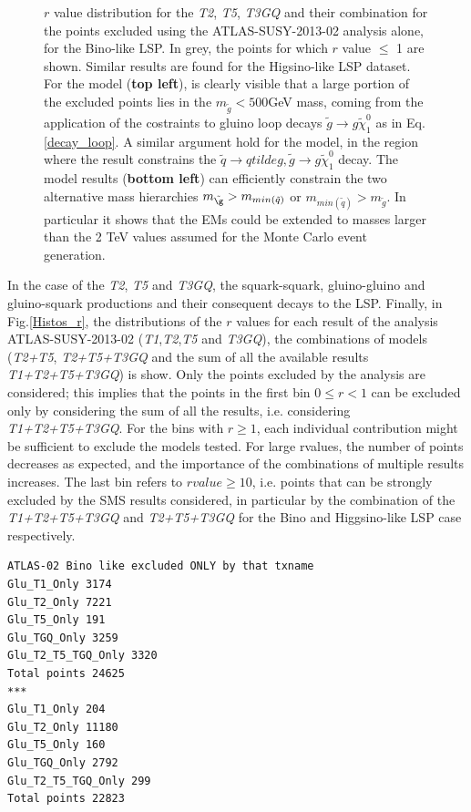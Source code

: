 \documentclass[epj,nopacs,fleqn]{svjour}
\begin{document}
\begin{figure}[!]
	\caption{$r$ value distribution for the \textit{T2}, \textit{T5}, \textit{T3GQ} and their combination for the points excluded using the ATLAS-SUSY-2013-02 analysis alone, for the Bino-like LSP. In grey, the points for which $r$ value $\leq$ 1 are shown. Similar results are found for the Higsino-like LSP dataset. For the \Ttwo model (\textbf{top left}), is clearly visible that a large portion of the excluded points lies in the $m_{\tilde g}<500 $GeV mass, coming from the application of the costraints to gluino loop decays $\tilde g \rightarrow g \tilde \chi _1 ^0$ as in Eq. \ref{decay_loop}. A similar argument hold for the \Tfive model, in the region where the result constrains the $\tilde q \rightarrow q tilde g , \tilde g \rightarrow  g \tilde \chi _1 ^0$ decay. The \TGQ model results (\textbf{bottom left}) can efficiently constrain the two alternative mass hierarchies $m_{\tilde \g}>m_{min(\tilde q)}$ or $m_{min(\tilde q)}>m_{\tilde g }$. In particular it shows that the EMs could be extended to \MGLU masses larger than the 2 TeV values assumed for the Monte Carlo event generation.}
	\label{rvalues-bino}
\end{figure}
In the case of the \textit{T2}, \textit{T5} and \textit{T3GQ}, the squark-squark, gluino-gluino and gluino-squark productions and their consequent decays to the LSP. Finally, in Fig.\ref{Histos_r}, the distributions of the $r$ values for each result of the analysis ATLAS-SUSY-2013-02 (\textit{T1},\textit{T2},\textit{T5} and \textit{T3GQ}), the combinations of models (\textit{T2+T5}, \textit{T2+T5+T3GQ} and the sum of all the available results \textit{T1+T2+T5+T3GQ}) is show. Only the points excluded by the analysis are considered; this implies that the points in the first bin $0\leq r < 1$ can be excluded only by considering the sum of all the results, i.e. considering \textit{T1+T2+T5+T3GQ}. For the bins with $r \geq 1$, each individual contribution might be sufficient to exclude the models tested. For large rvalues, the number of points decreases as expected, and the importance of the combinations of multiple results increases. The last bin refers to $rvalue \geq 10$, i.e. points that can be strongly excluded by the SMS results considered, in particular by the combination of the \textit{T1+T2+T5+T3GQ} and \textit{T2+T5+T3GQ} for the Bino and Higgsino-like LSP case respectively. 
%
%
\iffalse
\begin{verbatim}
ATLAS-02 Bino like excluded ONLY by that txname
Glu_T1_Only 3174
Glu_T2_Only 7221
Glu_T5_Only 191
Glu_TGQ_Only 3259
Glu_T2_T5_TGQ_Only 3320
Total points 24625
***
Glu_T1_Only 204
Glu_T2_Only 11180
Glu_T5_Only 160
Glu_TGQ_Only 2792
Glu_T2_T5_TGQ_Only 299
Total points 22823
\end{verbatim}
\end{document}
